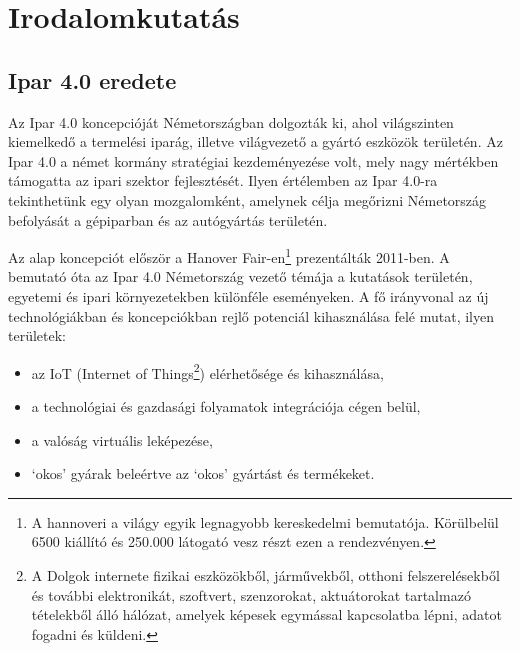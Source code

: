 \documentclass[../documentation.tex]{subfiles}
\begin{document}
\section{Irodalomkutatás}
\subsection{Ipar 4.0 eredete}
Az Ipar 4.0 koncepcióját Németországban dolgozták ki, ahol világszinten kiemelkedő a termelési iparág, illetve világvezető a gyártó eszközök területén. Az Ipar 4.0 a német kormány stratégiai kezdeményezése volt, mely nagy mértékben támogatta az ipari szektor fejlesztését. Ilyen értélemben az Ipar 4.0-ra tekinthetünk egy olyan mozgalomként, amelynek célja megőrizni Németország befolyását a gépiparban és az autógyártás területén.\cite{industry40}

Az alap koncepciót először a Hanover Fair-en\footnote{A hannoveri a világy egyik legnagyobb kereskedelmi bemutatója. Körülbelül 6500 kiállító és 250.000 látogató vesz részt ezen a rendezvényen.} prezentálták 2011-ben. A bemutató óta az Ipar 4.0 Németország vezető témája a kutatások területén, egyetemi és ipari környezetekben különféle eseményeken. A fő irányvonal az új technológiákban és koncepciókban rejlő potenciál kihasználása felé mutat, ilyen területek:
\begin{itemize}
	\item az IoT (\foreignlanguage{british}{Internet of Things}\footnote{A Dolgok internete fizikai eszközökből, járművekből, otthoni felszerelésekből és további elektronikát, szoftvert, szenzorokat, aktuátorokat tartalmazó tételekből álló hálózat, amelyek képesek egymással kapcsolatba lépni, adatot fogadni és küldeni.}) elérhetősége és kihasználása,
	\item a technológiai és gazdasági folyamatok integrációja cégen belül,
	\item a valóság virtuális leképezése,
	\item `okos' gyárak beleértve az `okos' gyártást és termékeket.
\end{itemize}
\end{document}
